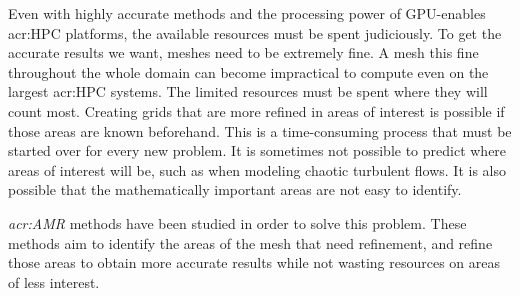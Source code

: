 Even with highly accurate methods and the processing power of GPU-enables \acrshort{acr:HPC}
platforms, the available resources must be spent judiciously. To get the accurate results we want,
meshes need to be extremely fine. A mesh this fine throughout the whole domain can become
impractical to compute even on the largest \acrshort{acr:HPC} systems. The limited resources must be
spent where they will count most. Creating grids that are more refined in areas of interest is
possible if those areas are known beforehand. This is a time-consuming process that must be started
over for every new problem. It is sometimes not possible to predict where areas of interest will be,
such as when modeling chaotic turbulent flows. It is also possible that the mathematically important
areas are not easy to identify. 

\textit{\Acrfull{acr:AMR}} methods have been studied in order to solve this problem. These methods
aim to identify the areas of the mesh that need refinement, and refine those areas to obtain more
accurate results while not wasting resources on areas of less interest. ~\cite{Berger1984}


